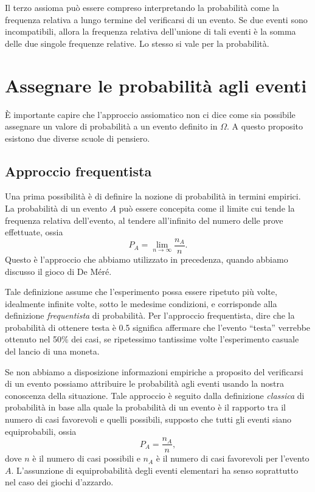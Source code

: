 Il terzo assioma può essere compreso interpretando la probabilità come la frequenza relativa a lungo termine del verificarsi di un evento.
Se due eventi sono incompatibili, allora la frequenza relativa dell'unione di tali eventi è la somma delle due singole frequenze relative.
Lo stesso si vale per la probabilità.


\section{Assegnare le probabilità agli eventi}

È importante capire che l'approccio assiomatico non ci dice come sia possibile assegnare un valore di probabilità a un evento definito in $\Omega$.
A questo proposito esistono due diverse scuole di pensiero.




\subsection{Approccio frequentista}

Una prima possibilità è di definire la nozione di probabilità in termini empirici. 
La probabilità di un evento $A$ può essere concepita come il limite cui tende la  frequenza relativa dell'evento, al tendere all'infinito del numero delle prove effettuate, ossia 
\begin{equation}
P_A = \lim_{n \to \infty} \frac{n_A}{n}.
\end{equation}
Questo è l'approccio che abbiamo utilizzato in precedenza, quando abbiamo discusso il gioco di De Méré.

Tale  definizione assume che l'esperimento possa essere ripetuto più volte, idealmente infinite volte, sotto le medesime condizioni, e corrisponde alla definizione \emph{frequentista} di probabilità.
Per l'approccio frequentista, dire che la probabilità di ottenere testa è 0.5 significa affermare che l'evento \enquote{testa} verrebbe ottenuto nel 50\% dei casi, se ripetessimo tantissime volte l'esperimento casuale del lancio di una moneta.

Se non abbiamo a disposizione informazioni empiriche a proposito del verificarsi di un evento possiamo attribuire le probabilità agli eventi usando la nostra conoscenza della situazione. 
Tale approccio è seguito dalla definizione \emph{classica} di probabilità in base alla quale la  probabilità di un evento è il rapporto tra il numero di casi favorevoli e quelli possibili, supposto che tutti gli eventi siano equiprobabili, ossia 
\begin{equation}
P_A = \frac{n_A}{n},
\end{equation}
dove $n$ è il numero di casi possibili e $n_A$ è il numero di casi favorevoli per l'evento $A$. 
L'assunzione di equiprobabilità degli eventi elementari ha senso soprattutto nel caso dei giochi d'azzardo. 

